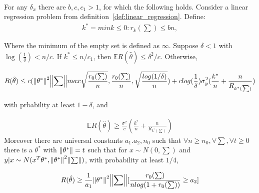 \documentclass[a4paper,12pt]{scrartcl}
\theoremstyle{definition}
\begin{document}
\begin{thm}\ \\
	For any $\delta_x$ there are $b,c,c_1 > 1$, for which the following holds. Consider a linear regression problem from definition~\ref{def:linear_regression}. Define:
\begin{equation}
\begin{aligned}
k^* = min {k \leq 0: r_k(\sum) \leq bn},
\end{aligned}
\end{equation}

Where the minimum of the empty set is defined as $\infty$. Suppose $\delta < 1$ with $\log(\frac{1}{\delta}) < n/c$. If $k^* \leq n/c_1$, then $\mathbb{E}R(\hat{\theta}) \leq \delta^2/c.$ Otherwise,

\begin{equation}
\begin{aligned}
R(\hat{\theta}) \leq c(\norm{\theta^*}^2\norm{\sum}max{\sqrt{\frac{r_0(\sum)}{n}},\frac{r_0(\sum)}{n},\sqrt{\frac{log(1/\delta)}{n}}}) + clog(\frac{1}{\delta})\sigma_y^2(\frac{k^*}{n} + \frac{n}{R_{k^*(\sum)}}) \\
\end{aligned}
\end{equation}

with prbability at least $1 - \delta$, and 

\begin{equation}
\begin{aligned}
\mathbb{E}R(\hat{\theta}) \geq \frac{\sigma^2}{c} (\frac{k^*}{n} + \frac{n}{R_{k^*(\sum)}}) 
\end{aligned}
\end{equation}
Moreover there are universal constants $a_1.a_2,n_0$ such that $\forall n \geq n_0, \forall \sum, \forall t \geq 0$ there is a $\theta^*$ with $\norm{\theta^*} = t$ such that for $x \sim N(0,\sum)$ and $y|x \sim N(x^T\theta^*,\norm{\theta^*}^2\norm{\sum})$, with probability at least $1/4$,

\begin{equation}
\begin{aligned}
R(\hat{\theta})\geq \frac{1}{a_1}\norm{\theta^*}^2\norm{\sum}[\frac{r_0(\sum)}{nlog(1+r_0(\sum))} \geq a_2]
\end{aligned}
\end{equation}
 
\end{thm}
\end{document}

